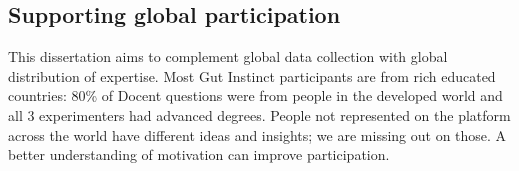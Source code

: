 


%
%

\subsection{Supporting global participation}
This dissertation aims to complement global data collection with global distribution of expertise. Most Gut Instinct participants are from rich educated countries: 80\% of Docent questions were from people in the developed world and all 3 experimenters had advanced degrees. People not represented on the platform across the world have different ideas and insights; we are missing out on those. A better understanding of motivation can improve participation.

